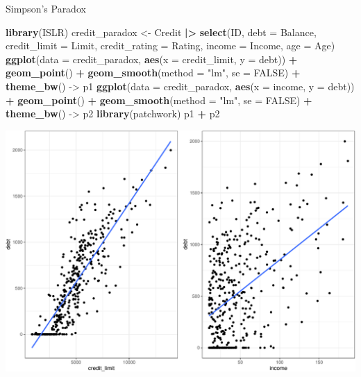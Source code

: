 \documentclass[
  ignorenonframetext,
]{beamer}
\newenvironment{Shaded}{\begin{snugshade}}{\end{snugshade}}
\newcommand{\AttributeTok}[1]{\textcolor[rgb]{0.13,0.29,0.53}{#1}}
\newcommand{\ConstantTok}[1]{\textcolor[rgb]{0.56,0.35,0.01}{#1}}
\newcommand{\FunctionTok}[1]{\textcolor[rgb]{0.13,0.29,0.53}{\textbf{#1}}}
\newcommand{\NormalTok}[1]{#1}
\newcommand{\OtherTok}[1]{\textcolor[rgb]{0.56,0.35,0.01}{#1}}
\newcommand{\SpecialCharTok}[1]{\textcolor[rgb]{0.81,0.36,0.00}{\textbf{#1}}}
\newcommand{\StringTok}[1]{\textcolor[rgb]{0.31,0.60,0.02}{#1}}
\begin{document}
\begin{frame}[fragile]{Simpson's Paradox}
\protect\hypertarget{simpsons-paradox}{}
\tiny

\begin{Shaded}
\begin{Highlighting}[]
\FunctionTok{library}\NormalTok{(ISLR)}
\NormalTok{credit\_paradox }\OtherTok{\textless{}{-}}\NormalTok{ Credit }\SpecialCharTok{|\textgreater{}} 
  \FunctionTok{select}\NormalTok{(ID, }\AttributeTok{debt =}\NormalTok{ Balance, }\AttributeTok{credit\_limit =}\NormalTok{ Limit, }
         \AttributeTok{credit\_rating =}\NormalTok{ Rating, }\AttributeTok{income =}\NormalTok{ Income, }\AttributeTok{age =}\NormalTok{ Age)}
\FunctionTok{ggplot}\NormalTok{(}\AttributeTok{data =}\NormalTok{ credit\_paradox, }\FunctionTok{aes}\NormalTok{(}\AttributeTok{x =}\NormalTok{ credit\_limit, }\AttributeTok{y =}\NormalTok{ debt)) }\SpecialCharTok{+} 
  \FunctionTok{geom\_point}\NormalTok{() }\SpecialCharTok{+} 
  \FunctionTok{geom\_smooth}\NormalTok{(}\AttributeTok{method =} \StringTok{"lm"}\NormalTok{, }\AttributeTok{se =} \ConstantTok{FALSE}\NormalTok{) }\SpecialCharTok{+} 
  \FunctionTok{theme\_bw}\NormalTok{() }\OtherTok{{-}\textgreater{}}\NormalTok{ p1}
\FunctionTok{ggplot}\NormalTok{(}\AttributeTok{data =}\NormalTok{ credit\_paradox, }\FunctionTok{aes}\NormalTok{(}\AttributeTok{x =}\NormalTok{ income, }\AttributeTok{y =}\NormalTok{ debt)) }\SpecialCharTok{+} 
  \FunctionTok{geom\_point}\NormalTok{() }\SpecialCharTok{+} 
  \FunctionTok{geom\_smooth}\NormalTok{(}\AttributeTok{method =} \StringTok{"lm"}\NormalTok{, }\AttributeTok{se =} \ConstantTok{FALSE}\NormalTok{) }\SpecialCharTok{+} 
  \FunctionTok{theme\_bw}\NormalTok{() }\OtherTok{{-}\textgreater{}}\NormalTok{ p2}
\FunctionTok{library}\NormalTok{(patchwork)}
\NormalTok{p1 }\SpecialCharTok{+}\NormalTok{ p2}
\end{Highlighting}
\end{Shaded}

\begin{center}\includegraphics[width=0.8\linewidth,height=0.4\textheight]{Week5_Lect_files/figure-beamer/unnamed-chunk-48-1} \end{center}
\normalsize
\end{frame}
\end{document}
